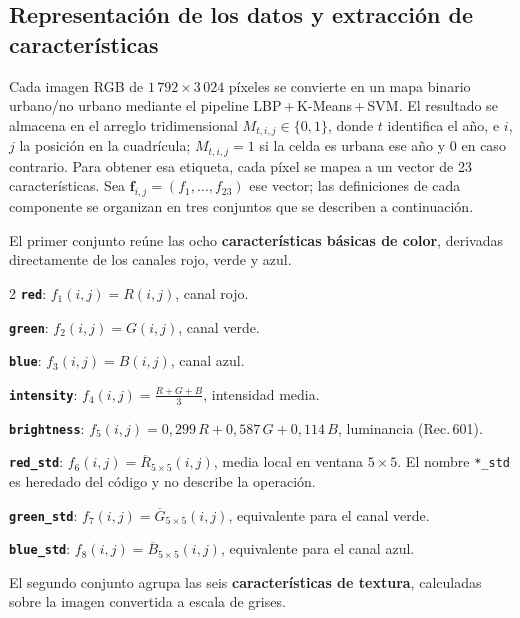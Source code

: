 \subsection{Representación de los datos y extracción de características}

Cada imagen RGB de $1\,792 \times 3\,024$ píxeles se convierte en un mapa binario urbano/no urbano mediante el pipeline LBP\,+\,K-Means\,+\,SVM. El resultado se almacena en el arreglo tridimensional $M_{t,i,j} \in \{0,1\}$, donde $t$ identifica el año, e $i$, $j$ la posición en la cuadrícula; $M_{t,i,j} = 1$ si la celda es urbana ese año y $0$ en caso contrario. Para obtener esa etiqueta, cada píxel se mapea a un vector de 23 características. Sea $\mathbf{f}_{i,j} = (f_1, \ldots, f_{23})$ ese vector; las definiciones de cada componente se organizan en tres conjuntos que se describen a continuación.

El primer conjunto reúne las ocho \textbf{características básicas de color}, derivadas directamente de los canales rojo, verde y azul.

\begin{multicols}{2}
\small\setlength{\parindent}{0pt}\setlength{\parskip}{4pt}
\textbf{\texttt{red}}: $f_1(i,j) = R(i,j)$, canal rojo.\par
\textbf{\texttt{green}}: $f_2(i,j) = G(i,j)$, canal verde.\par
\textbf{\texttt{blue}}: $f_3(i,j) = B(i,j)$, canal azul.\par
\textbf{\texttt{intensity}}: $f_4(i,j) = \tfrac{R+G+B}{3}$, intensidad media.\par
\textbf{\texttt{brightness}}: $f_5(i,j) = 0{,}299\,R + 0{,}587\,G + 0{,}114\,B$, luminancia (Rec.\,601).\par
\textbf{\texttt{red\_std}}: $f_6(i,j) = \overline{R}_{5\times5}(i,j)$, media local en ventana $5\times5$. El nombre \texttt{*\_std} es heredado del código y no describe la operación.\par
\textbf{\texttt{green\_std}}: $f_7(i,j) = \overline{G}_{5\times5}(i,j)$, equivalente para el canal verde.\par
\textbf{\texttt{blue\_std}}: $f_8(i,j) = \overline{B}_{5\times5}(i,j)$, equivalente para el canal azul.\par
\end{multicols}

El segundo conjunto agrupa las seis \textbf{características de textura}, calculadas sobre la imagen convertida a escala de grises.

